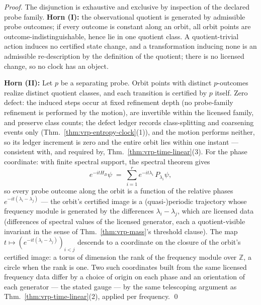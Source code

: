 \documentclass[12pt,oneside]{amsbook}
\theoremstyle{plain}
\theoremstyle{definition}
\theoremstyle{remark}
\begin{document}
\begin{proof}
The disjunction is exhaustive and exclusive by inspection of the
declared probe family.  \textbf{Horn (I):} the observational
quotient is generated by admissible probe outcomes; if every
outcome is constant along an orbit, all orbit points are
outcome-indistinguishable, hence lie in one quotient class.  A
quotient-trivial action induces no certified state change, and a
transformation inducing none is an admissible re-description by
the definition of the quotient; there is no licensed change, so
no clock has an object.

\textbf{Horn (II):}  Let $p$ be a separating probe.  Orbit points
with distinct $p$-outcomes realize distinct quotient classes, and
each transition is certified by $p$ itself.  Zero defect: the
induced steps occur at fixed refinement depth (no probe-family
refinement is performed by the motion), are invertible within the
licensed family, and preserve class counts; the defect ledger
records class-splitting and coarsening events only
(Thm.~\ref{thm:vrp-entropy-clock}(1)), and the motion performs
neither, so its ledger increment is zero and the entire orbit
lies within one instant --- consistent with, and required by,
Thm.~\ref{thm:vrp-time-linear}(3).  For the phase coordinate:
with finite spectral support, the spectral theorem gives
\[
  e^{-itH_B}\psi \;=\; \sum_{i=1}^{r} e^{-it\lambda_i}\,
  P_{\lambda_i}\psi,
\]
so every probe outcome along the orbit is a function of the
relative phases $e^{-it(\lambda_i - \lambda_j)}$ --- the orbit's
certified image is a (quasi-)periodic trajectory whose frequency
module is generated by the differences
$\lambda_i - \lambda_j$, which are licensed data
(differences of spectral values of the licensed generator, each a
quotient-visible invariant in the sense of
Thm.~\ref{thm:vrp-mass}'s threshold clause).  The map
$t \mapsto (e^{-it(\lambda_i - \lambda_j)})_{i<j}$ descends to a
coordinate on the closure of the orbit's certified image: a torus
of dimension the rank of the frequency module over
$\mathbb{Z}$, a circle when the rank is one.  Two such
coordinates built from the same licensed frequency data differ by
a choice of origin on each phase and an orientation of each
generator --- the stated gauge --- by the same telescoping
argument as Thm.~\ref{thm:vrp-time-linear}(2), applied per
frequency.  \qed
\end{proof}
\end{document}
